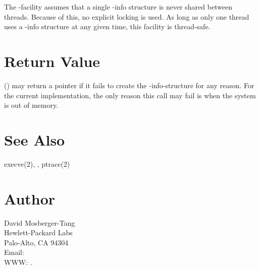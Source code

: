 \documentclass{article}
\begin{document}
The -facility assumes that a single -info
structure is never shared between threads.  Because of this, no
explicit locking is used.  As long as only one thread uses
a -info structure at any given time, this facility
is thread-safe.

\section{Return Value}

() may return a  pointer if it fails
to create the -info-structure for any reason.  For the
current implementation, the only reason this call may fail is when the
system is out of memory.

\section{See Also}

execve(2),
,
ptrace(2)

\section{Author}

\noindent
David Mosberger-Tang\\
Hewlett-Packard Labs\\
Palo-Alto, CA 94304\\
Email: \\
WWW: .
\LatexManEnd
\end{document}

